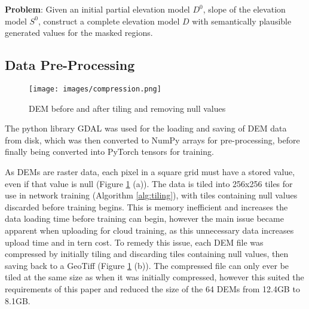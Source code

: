 \documentclass[twocolumn]{article}
\begin{document}
\textbf{Problem}: Given an initial partial elevation model \(D^0\), slope of the elevation model \(S^0\), construct a complete elevation model \(D\) with semantically plausible generated values for the masked regions.


\subsection{Data Pre-Processing}
\label{sec:org7312928}

\begin{figure}[htbp]
\centering
\texttt{[image: images/compression.png]}
\caption{\label{fig:compression}DEM before and after tiling and removing null values}
\end{figure}

The python library GDAL\autocite{rouaultevenGDAL2023} was used for the loading and saving of DEM data from disk, which was then converted to NumPy\autocite{NumPy} arrays for pre-processing, before finally being converted into PyTorch\autocite{PyTorch} tensors for training.

As DEMs are raster data, each pixel in a square grid must have a stored value, even if that value is null (Figure \ref{fig:compression} (a)).
The data is tiled into 256x256 tiles for use in network training (Algorithm \ref{alg:tiling}), with tiles containing null values discarded before training begins.
This is memory inefficient and increases the data loading time before training can begin, however the main issue became apparent when uploading for cloud training, as this unnecessary data increases upload time and in tern cost.
To remedy this issue, each DEM file was compressed by initially tiling and discarding tiles containing null values, then saving back to a GeoTiff (Figure \ref{fig:compression} (b)).
The compressed file can only ever be tiled at the same size as when it was initially compressed, however this suited the requirements of this paper and reduced the size of the 64 DEMs from 12.4GB to 8.1GB.
\end{document}
